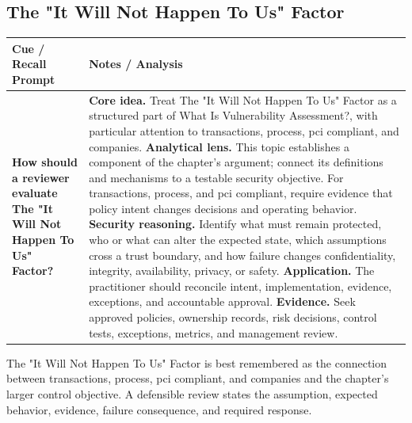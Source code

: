 \documentclass[11pt]{article}
\newcommand{\CornellHeader}{%
\rowcolor{Navy}\color{white}\bfseries Cue / Recall Prompt & \color{white}\bfseries Notes / Analysis\\\hline}
\newcommand{\CornellRow}[2]{%
\cellcolor{CueGray}\RaggedRight\textbf{#1} & \RaggedRight #2\\\hline}
\begin{document}
\subsection*{The "It Will Not Happen To Us" Factor}
\begin{longtable}{>{\RaggedRight\arraybackslash}p{}|>{\RaggedRight\arraybackslash}p{}}
\CornellHeader
\CornellRow{How should a reviewer evaluate The "It Will Not Happen To Us" Factor?}{\textbf{Core idea.} Treat The "It Will Not Happen To Us" Factor as a structured part of What Is Vulnerability Assessment?, with particular attention to transactions, process, pci compliant, and companies. \textbf{Analytical lens.} This topic establishes a component of the chapter's argument; connect its definitions and mechanisms to a testable security objective. For transactions, process, and pci compliant, require evidence that policy intent changes decisions and operating behavior. \textbf{Security reasoning.} Identify what must remain protected, who or what can alter the expected state, which assumptions cross a trust boundary, and how failure changes confidentiality, integrity, availability, privacy, or safety. \textbf{Application.} The practitioner should reconcile intent, implementation, evidence, exceptions, and accountable approval. \textbf{Evidence.} Seek approved policies, ownership records, risk decisions, control tests, exceptions, metrics, and management review.}
\end{longtable}
\begin{topicsummary}
The "It Will Not Happen To Us" Factor is best remembered as the connection between transactions, process, pci compliant, and companies and the chapter's larger control objective. A defensible review states the assumption, expected behavior, evidence, failure consequence, and required response.
\end{topicsummary}
\end{document}
